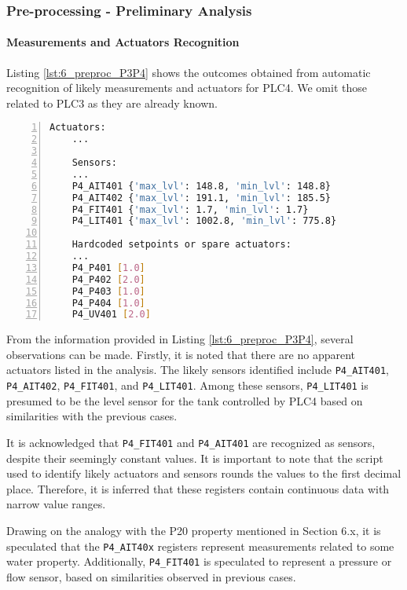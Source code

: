 \subsubsection{Pre-processing - Preliminary Analysis}
\label{subsubsec:6_P3P4_preprocessing}

\paragraph{Measurements and Actuators Recognition}
\label{par:6_P3P4_measures_actuators_recognition}

Listing \ref{lst:6_preproc_P3P4} shows the outcomes obtained from automatic recognition of likely measurements and actuators for PLC4. We omit those related to PLC3 as they are already known.

\begin{lstlisting}[language=bash, numbers=left, caption=Preliminary analysis outcomes for sensors and actuators of \texttt{PLC3-4}, label=lst:6_preproc_P3P4]
	Actuators: 
	...
	
	Sensors: 
	...
	P4_AIT401 {'max_lvl': 148.8, 'min_lvl': 148.8}
	P4_AIT402 {'max_lvl': 191.1, 'min_lvl': 185.5}
	P4_FIT401 {'max_lvl': 1.7, 'min_lvl': 1.7}
	P4_LIT401 {'max_lvl': 1002.8, 'min_lvl': 775.8}
	
	Hardcoded setpoints or spare actuators: 
	...
	P4_P401 [1.0]
	P4_P402 [2.0]
	P4_P403 [1.0]
	P4_P404 [1.0]
	P4_UV401 [2.0]
\end{lstlisting}

From the information provided in Listing \ref{lst:6_preproc_P3P4}, several observations can be made. Firstly, it is noted that there are no apparent actuators listed in the analysis. The likely sensors identified include \texttt{P4\_AIT401}, \texttt{P4\_AIT402}, \texttt{P4\_FIT401}, and \texttt{P4\_LIT401}. Among these sensors, \texttt{P4\_LIT401} is presumed to be the level sensor for the tank controlled by PLC4 based on similarities with the previous cases.

\bigskip
It is acknowledged that \texttt{P4\_FIT401} and \texttt{P4\_AIT401} are recognized as sensors, despite their seemingly constant values. It is important to note that the script used to identify likely actuators and sensors rounds the values to the first decimal place. Therefore, it is inferred that these registers contain continuous data with narrow value ranges.

Drawing on the analogy with the P20 property mentioned in Section 6.x, it is speculated that the \texttt{P4\_AIT40x} registers represent measurements related to some water property. Additionally, \texttt{P4\_FIT401} is speculated to represent a pressure or flow sensor, based on similarities observed in previous cases.

